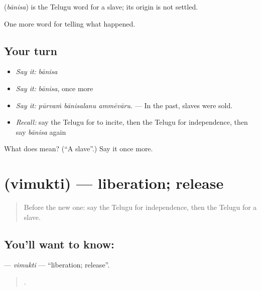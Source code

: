 \begin{cousinweb}
\textbf{} (\emph{bānisa}) is the Telugu word for a slave; its origin is not settled.
\end{cousinweb}

\begin{grammarlens}[title={What you've built}]
One more word for telling what happened.
\end{grammarlens}

\subsection*{Your turn}
\begin{itemize}
\raggedright
  \item \emph{Say it:} \emph{bānisa}
  \item \emph{Say it:} \emph{bānisa}, once more
  \item \emph{Say it:} \emph{pūrvaṁ bānisalanu ammēvāru.} — In the past, slaves were sold.
  \item \emph{Recall:} say the Telugu for to incite, then the Telugu for independence, then say \emph{bānisa} again
\end{itemize}

\begin{tcolorbox}[breakable,colback=teal!4,colframe=teal!35!black,title={Before you move on}]
What does  mean? (\textquotedblleft{}A slave\textquotedblright{}.) Say it once more.
\end{tcolorbox}
\section[\texorpdfstring{\te{విముక్తి} (vimukti)}{విముక్తి (vimukti)}]{ (vimukti) — liberation; release}

\label{lesson:TE-C364-vimukti}



\begin{quote}
Before the new one: say the Telugu for independence, then the Telugu for a slave.
\end{quote}

\subsection*{You'll want to know: }
\textbf{} — \emph{vimukti} — \textquotedblleft{}liberation; release\textquotedblright{}.

\begin{quote}
   .
\end{quote}

